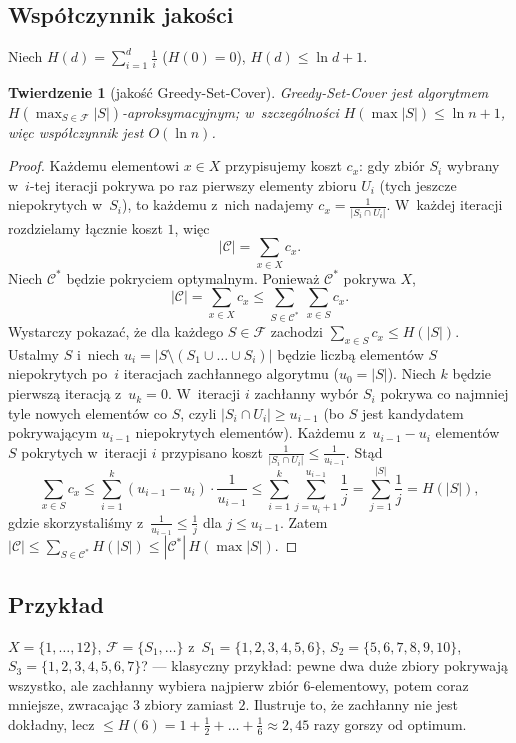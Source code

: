 \documentclass[11pt,a4paper]{article}
\theoremstyle{plain}
\newtheorem{twierdzenie}{Twierdzenie}[section]
\theoremstyle{definition}
\begin{document}
\subsection*{Współczynnik jakości}
Niech $H(d)=\sum_{i=1}^d \tfrac1i$ ($H(0)=0$), $H(d)\le\ln d+1$.
\begin{twierdzenie}[jakość Greedy-Set-Cover]\label{tw:setcover}
Greedy-Set-Cover jest algorytmem $H(\max_{S\in\mathcal F}|S|)$-aproksymacyjnym; w~szczególności
$H(\max|S|)\le \ln n+1$, więc współczynnik jest $O(\ln n)$.
\end{twierdzenie}
\begin{proof}
Każdemu elementowi $x\in X$ przypisujemy koszt $c_x$: gdy zbiór $S_i$ wybrany w~$i$-tej iteracji
pokrywa po raz pierwszy elementy zbioru $U_i$ (tych jeszcze niepokrytych w~$S_i$), to każdemu z~nich
nadajemy $c_x=\tfrac{1}{|S_i\cap U_i|}$. W~każdej iteracji rozdzielamy łącznie koszt $1$, więc
\[
|\mathcal C|=\sum_{x\in X} c_x .
\]
Niech $\mathcal C^\ast$ będzie pokryciem optymalnym. Ponieważ $\mathcal C^\ast$ pokrywa $X$,
\[
|\mathcal C|=\sum_{x\in X}c_x\le \sum_{S\in\mathcal C^\ast}\ \sum_{x\in S} c_x .
\]
Wystarczy pokazać, że dla każdego $S\in\mathcal F$ zachodzi $\sum_{x\in S}c_x\le H(|S|)$. Ustalmy $S$ i~niech
$u_i=|S\setminus(S_1\cup\dots\cup S_i)|$ będzie liczbą elementów $S$ niepokrytych po~$i$ iteracjach
zachłannego algorytmu ($u_0=|S|$). Niech $k$ będzie pierwszą iteracją z~$u_k=0$. W~iteracji $i$ zachłanny
wybór $S_i$ pokrywa co najmniej tyle nowych elementów co $S$, czyli $|S_i\cap U_i|\ge u_{i-1}$ (bo
$S$ jest kandydatem pokrywającym $u_{i-1}$ niepokrytych elementów). Każdemu z~$u_{i-1}-u_i$ elementów
$S$ pokrytych w~iteracji $i$ przypisano koszt $\tfrac{1}{|S_i\cap U_i|}\le\tfrac{1}{u_{i-1}}$. Stąd
\[
\sum_{x\in S}c_x\le\sum_{i=1}^k (u_{i-1}-u_i)\cdot\frac{1}{u_{i-1}}
\le\sum_{i=1}^k\sum_{j=u_i+1}^{u_{i-1}}\frac1j
=\sum_{j=1}^{|S|}\frac1j=H(|S|),
\]
gdzie skorzystaliśmy z~$\tfrac{1}{u_{i-1}}\le\tfrac1j$ dla $j\le u_{i-1}$. Zatem
$|\mathcal C|\le\sum_{S\in\mathcal C^\ast}H(|S|)\le |\mathcal C^\ast|\,H(\max|S|)$.
\end{proof}

\subsection*{Przykład}
$X=\{1,\dots,12\}$, $\mathcal F=\{S_1,\dots\}$ z~$S_1=\{1,2,3,4,5,6\}$, $S_2=\{5,6,7,8,9,10\}$,
$S_3=\{1,2,3,4,5,6,7\}$? --- klasyczny przykład: pewne dwa duże zbiory pokrywają wszystko, ale zachłanny
wybiera najpierw zbiór $6$-elementowy, potem coraz mniejsze, zwracając $3$ zbiory zamiast $2$. Ilustruje to,
że zachłanny nie jest dokładny, lecz $\le H(6)=1+\tfrac12+\dots+\tfrac16\approx2{,}45$ razy gorszy od optimum.
\end{document}
